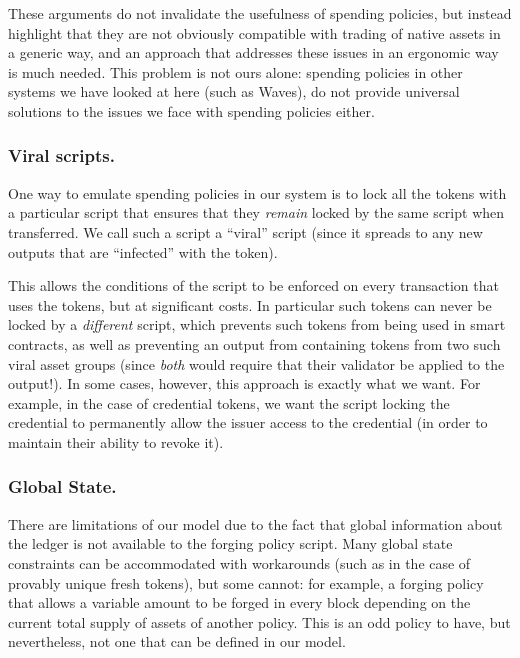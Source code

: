 These arguments do not invalidate the usefulness of spending policies, but instead highlight that
they are not obviously compatible with trading of native assets in a generic way, and an approach that addresses these issues in an ergonomic way is much needed.
This problem is not ours alone: spending policies in other systems we have looked at here (such as Waves),
do not provide universal solutions to the issues we face with spending policies either.

\subsubsection{Viral scripts.}

One way to emulate spending policies in our system is to lock all the tokens with a particular script that ensures
that they \emph{remain} locked by the same script when transferred.
We call such a script a ``viral'' script (since it spreads to any new outputs that are ``infected'' with the token).

This allows the conditions of the script to be enforced on every transaction that uses the tokens, but at significant costs.
In particular such tokens can never be locked by a \emph{different} script, which prevents such tokens from being used in smart contracts, as well as preventing an output from containing tokens from two such viral asset groups (since \emph{both} would require that their validator be applied to the output!).
In some cases, however, this approach is exactly what we want.
For example, in the case of credential tokens, we want
the script locking the credential to permanently allow the issuer access to the credential (in
order to maintain their ability to revoke it).

\subsubsection{Global State.}

There are limitations of our model due to the fact that global information about the ledger is not available to the forging policy script.
Many global state constraints can be accommodated with workarounds (such as in the case of provably unique fresh tokens), but some cannot:
for example, a forging policy that allows a variable amount to be forged in every block depending on the current total supply of assets of another policy.
This is an odd policy to have, but nevertheless, not one that can be defined in our model.

